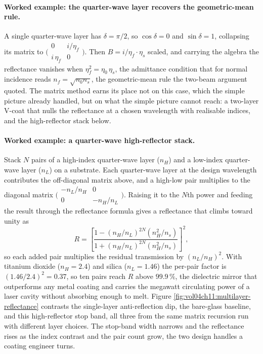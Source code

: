 \paragraph{Worked example: the quarter-wave layer recovers the geometric-mean
rule.} A single quarter-wave layer has $\delta = \pi/2$, so $\cos\delta = 0$ and
$\sin\delta = 1$, collapsing its matrix to
$\big(\begin{smallmatrix} 0 & i/\eta_f \\ i\,\eta_f & 0\end{smallmatrix}\big)$.
Then $B = i/\eta_f \cdot \eta_s$ scaled, and carrying the algebra the reflectance
vanishes when $\eta_f^2 = \eta_0\,\eta_s$, the admittance condition that for
normal incidence reads $n_f = \sqrt{n_0 n_s}$, the geometric-mean rule the
two-beam argument quoted. The matrix method earns its place not on this case,
which the simple picture already handled, but on what the simple picture cannot
reach: a two-layer V-coat that nulls the reflectance at a chosen wavelength with
realisable indices, and the high-reflector stack below.

\paragraph{Worked example: a quarter-wave high-reflector stack.} Stack $N$
pairs of a high-index quarter-wave layer ($n_H$) and a low-index quarter-wave
layer ($n_L$) on a substrate. Each quarter-wave layer at the design wavelength
contributes the off-diagonal matrix above, and a high-low pair multiplies to the
diagonal matrix $\big(\begin{smallmatrix} -n_L/n_H & 0 \\ 0 &
-n_H/n_L\end{smallmatrix}\big)$. Raising it to the $N$th power and feeding the
result through the reflectance formula gives a reflectance that climbs toward
unity as
\[
R = \left[\frac{1 - (n_H/n_L)^{2N}(n_H^2/n_s)}
{1 + (n_H/n_L)^{2N}(n_H^2/n_s)}\right]^{2},
\]
so each added pair multiplies the residual transmission by $(n_L/n_H)^2$. With
titanium dioxide ($n_H = 2.4$) and silica ($n_L = 1.46$) the per-pair factor is
$(1.46/2.4)^2 = 0.37$, so ten pairs reach $R$ above $99.9\,\%$, the dielectric
mirror that outperforms any metal coating and carries the megawatt
circulating power of a laser cavity without absorbing enough to melt. Figure
\ref{fig:vol04ch11:multilayer-reflectance} contrasts the single-layer
anti-reflection dip, the bare-glass baseline, and this high-reflector stop band,
all three from the same matrix recursion run with different layer choices. The
stop-band width narrows and the reflectance rises as the index contrast and the
pair count grow, the two design handles a coating engineer turns.

